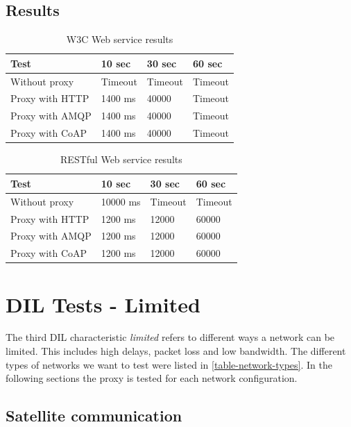 \subsection{Results}

\begin{table}[h!]
\begin{tabular}{| l | l | l | l |}
\hline
  \textbf{Test} & \textbf{10 sec} & \textbf{30 sec} & \textbf{60 sec} \\ \hline
  Without proxy & Timeout & Timeout & Timeout \\ \hline
  Proxy with HTTP & 1400 ms & 40000 & Timeout \\ \hline
  Proxy with AMQP & 1400 ms & 40000 & Timeout \\ \hline
  Proxy with CoAP & 1400 ms & 40000 & Timeout \\ \hline
\end{tabular}
\caption{W3C Web service results}
\end{table}

\begin{table}[h!]
\begin{tabular}{| l | l | l | l |}
\hline
  \textbf{Test} & \textbf{10 sec} & \textbf{30 sec} & \textbf{60 sec} \\ \hline
  Without proxy & 10000 ms & Timeout & Timeout \\ \hline
  Proxy with HTTP & 1200 ms & 12000 & 60000 \\ \hline
  Proxy with AMQP & 1200 ms & 12000 & 60000 \\ \hline
  Proxy with CoAP & 1200 ms & 12000 & 60000 \\ \hline
\end{tabular}
\caption{RESTful Web service results}
\end{table}

\section{DIL Tests - Limited}

The third DIL characteristic \textit{limited} refers to different ways a network
can be limited. This includes high delays, packet loss and low bandwidth. The
different types of networks we want to test were listed in
\cref{table-network-types}. In the following sections the proxy is tested for
each network configuration.


\subsection{Satellite communication}

